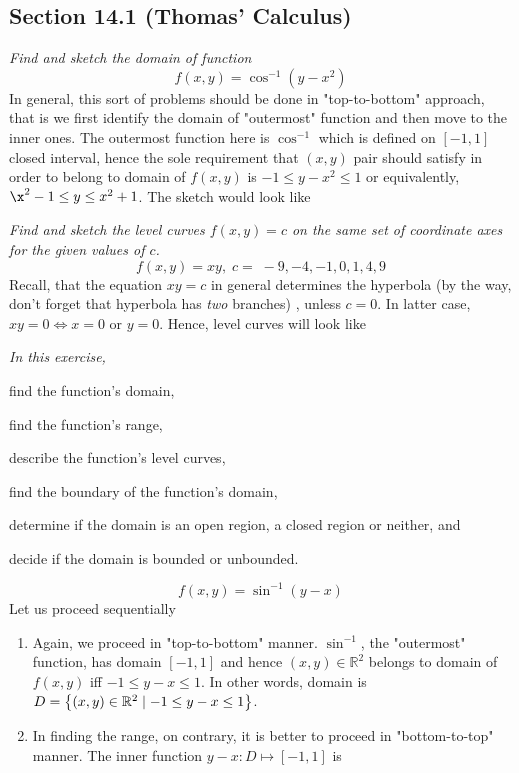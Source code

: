 \documentclass[8pt]{article} %
\begin{document}
\begin{description}
\section{Section 14.1 (Thomas' Calculus)}
	\item[\# 9.]{{\it Find and sketch the domain of function} \[f(x,y)=\cos^{-1}(y-x^2)\]
		In general, this sort of problems should be done in "top-to-bottom" approach, that is we first identify the domain of "outermost"
		function and then move to the inner ones. The outermost function here is $\cos^{-1}$ which is defined on $[-1,1]$ closed interval,
		hence the sole requirement that $(x,y)$ pair should satisfy in order to belong to domain of $f(x,y)$ is $-1\leq y-x^2\leq 1$ or
		equivalently, $\x^2-1\leq y\leq x^2+1$. The sketch would look like 
		}
	\item[\# 15.]{{\it Find and sketch the level curves $f(x,y)=c$ on the same set of coordinate axes for the given values of $c$.
		\[f(x,y)=xy,\;c=\;-9,-4,-1,0,1,4,9\]}
		Recall, that the equation $xy=c$ in general determines the hyperbola (by the way, don't forget that hyperbola has \textit{two} branches)
		, unless $c=0$. In latter case, $xy=0\iff x=0\mbox{ or }y=0$. Hence, level curves will look like 
		}
	\item[\# 27.]{{\it In this exercise, \begin{inparaenum}[\bfseries(a)]\item find the function's domain, \item find the function's range,
		\item describe the function's level curves, \item find the boundary of the function's domain, \item determine if the domain is an open
			region, a closed region or neither, and \item decide if the domain is bounded or unbounded.\end{inparaenum}}
			\[f(x,y)=\sin^{-1}(y-x)\]
		Let us proceed sequentially
		\begin{enumerate}[\bfseries(a)]
			\item Again, we proceed in "top-to-bottom" manner. $\sin^{-1}$, the "outermost" function, has domain $[-1,1]$ and hence $(x,y)\in\mathbb{R}^2$
				belongs to domain of $f(x,y)$ iff $-1\leq y-x\leq 1$. In other words, domain is $D=\left\{(x,y)\in\mathbb{R}^2\mid -1\leq y-x\leq 1\right\}$.
			\item In finding the range, on contrary, it is better to proceed in "bottom-to-top" manner. The inner function $y-x:D\mapsto[-1,1]$ is

\end{enumerate}}
\end{description}
\end{document}
